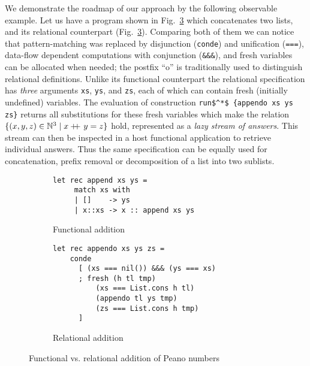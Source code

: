 We demonstrate the roadmap of our approach by the following observable example. Let us have a program
shown in Fig.~\ref{fun_vs_rel} which concatenates two lists,
and its relational counterpart (Fig.~\ref{fun_vs_rel}).
Comparing both of them we can notice that pattern-matching was replaced by disjunction (\lstinline[language=ocanren,basicstyle=\small]|conde|)
and unification (\lstinline[language=ocanren,basicstyle=\small]|===|), data-flow dependent computations with conjunction (\lstinline[language=ocanren,basicstyle=\small]|&&&|),
and fresh variables can be allocated when needed; the postfix ``o'' is traditionally used to distinguish relational definitions.
Unlike its functional
counterpart the relational specification has \emph{three} arguments \lstinline[language=ocanren,basicstyle=\small]|xs|, \lstinline[language=ocanren,basicstyle=\small]|ys|,
and \lstinline[language=ocanren,basicstyle=\small]|zs|, each of which can contain fresh (initially undefined) variables.
The evaluation of construction \lstinline[language=ocanren,basicstyle=\small]|run$^*$ {appendo xs ys zs}| returns all substitutions for these
fresh variables which make the relation $\{(x,y,z)\in\mathbb{N}^3 \mid x +\kern-1.3ex+\kern0.8ex y=z\}$ hold, represented as a \emph{lazy stream of answers}. This stream can
then be inspected in a host functional application to retrieve individual answers.
Thus the same specification can be equally used for concatenation,
prefix removal or decomposition of a list into two sublists.

\begin{figure}[t]
  \begin{subfigure}[t]{0.5\textwidth}
  \begin{lstlisting}[language=ocanren,basicstyle=\small]
   let rec append xs ys =
     match xs with
     | []    -> ys
     | x::xs -> x :: append xs ys
  \end{lstlisting}
  \caption{Functional addition}
  \label{funadd}
  \end{subfigure}
  \begin{subfigure}[t]{0.5\textwidth}
    \begin{lstlisting}[language=ocanren,basicstyle=\small]
  let rec appendo xs ys zs =
    conde
      [ (xs === nil()) &&& (ys === xs)
      ; fresh (h tl tmp)
          (xs === List.cons h tl)
          (appendo tl ys tmp)
          (zs === List.cons h tmp)
      ]
    \end{lstlisting}
    \caption{Relational addition}
    \label{reladd}
  \end{subfigure}
  \caption{Functional vs. relational addition of Peano numbers}
  \label{fun_vs_rel}
\end{figure}
